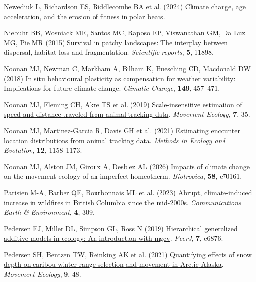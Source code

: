 \documentclass[
  12pt,
]{article}
\newlength{\cslhangindent}
\newenvironment{CSLReferences}[2] %
 {\begin{list}{}{%
  \setlength{\itemindent}{0pt}
  \setlength{\leftmargin}{0pt}
  \setlength{\parsep}{0pt}
  \ifodd #1
   \setlength{\leftmargin}{\cslhangindent}
   \setlength{\itemindent}{-1\cslhangindent}
  \fi
  \setlength{\itemsep}{#2\baselineskip}}}
 {\end{list}}
\begin{document}
\begin{CSLReferences}{1}{0}
Newediuk L, Richardson ES, Biddlecombe BA et al. (2024) \href{https://doi.org/10.1101/2024.01.05.574416}{Climate change, age acceleration, and the erosion of fitness in polar bears}.

Niebuhr BB, Wosniack ME, Santos MC, Raposo EP, Viswanathan GM, Da Luz MG, Pie MR (2015) Survival in patchy landscapes: The interplay between dispersal, habitat loss and fragmentation. \emph{Scientific reports}, \textbf{5}, 11898.

Noonan MJ, Newman C, Markham A, Bilham K, Buesching CD, Macdonald DW (2018) In situ behavioural plasticity as compensation for weather variability: Implications for future climate change. \emph{Climatic Change}, \textbf{149}, 457--471.

Noonan MJ, Fleming CH, Akre TS et al. (2019) \href{https://doi.org/10.1186/s40462-019-0177-1}{Scale-insensitive estimation of speed and distance traveled from animal tracking data}. \emph{Movement Ecology}, \textbf{7}, 35.

{Noonan MJ, Martinez-Garcia R, Davis GH et al.} (2021) Estimating encounter location distributions from animal tracking data. \emph{Methods in Ecology and Evolution}, \textbf{12}, 1158--1173.

Noonan MJ, Alston JM, Giroux A, Desbiez AL (2026) Impacts of climate change on the movement ecology of an imperfect homeotherm. \emph{Biotropica}, \textbf{58}, e70161.

Parisien M-A, Barber QE, Bourbonnais ML et al. (2023) \href{https://doi.org/10.1038/s43247-023-00977-1}{Abrupt, climate-induced increase in wildfires in {British} {Columbia} since the mid-2000s}. \emph{Communications Earth \& Environment}, \textbf{4}, 309.

Pedersen EJ, Miller DL, Simpson GL, Ross N (2019) \href{https://doi.org/10.7717/peerj.6876}{Hierarchical generalized additive models in ecology: An introduction with mgcv}. \emph{PeerJ}, \textbf{7}, e6876.

Pedersen SH, Bentzen TW, Reinking AK et al. (2021) \href{https://doi.org/10.1186/s40462-021-00276-4}{Quantifying effects of snow depth on caribou winter range selection and movement in {Arctic} {Alaska}}. \emph{Movement Ecology}, \textbf{9}, 48.


\end{CSLReferences}
\end{document}
